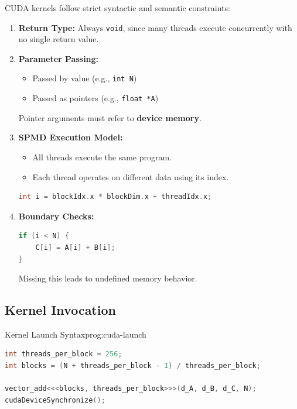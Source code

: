 \begin{ppnote}
CUDA kernels follow strict syntactic and semantic constraints:
\begin{enumerate}
    \item \textbf{Return Type:} Always \verb|void|, since many threads execute concurrently with no single return value.

    \item \textbf{Parameter Passing:}
    \begin{itemize}
        \item Passed by value (e.g., \verb|int N|)
        \item Passed as pointers (e.g., \verb|float *A|)
    \end{itemize}
    Pointer arguments must refer to \textbf{device memory}.

    \item \textbf{SPMD Execution Model:}
    \begin{itemize}
        \item All threads execute the same program.
        \item Each thread operates on different data using its index.
    \end{itemize}

\begin{lstlisting}[language=C++]
int i = blockIdx.x * blockDim.x + threadIdx.x;
\end{lstlisting}

    \item \textbf{Boundary Checks:}
\begin{lstlisting}[language=C++]
if (i < N) {
    C[i] = A[i] + B[i];
}
\end{lstlisting}
    Missing this leads to undefined memory behavior.
\end{enumerate}
\end{ppnote}

\subsection{Kernel Invocation}

\begin{ppprogram}{Kernel Launch Syntax}{prog:cuda-launch}
\begin{lstlisting}[language=C++]
int threads_per_block = 256;
int blocks = (N + threads_per_block - 1) / threads_per_block;

vector_add<<<blocks, threads_per_block>>>(d_A, d_B, d_C, N);
cudaDeviceSynchronize();
\end{lstlisting}
\end{ppprogram}

